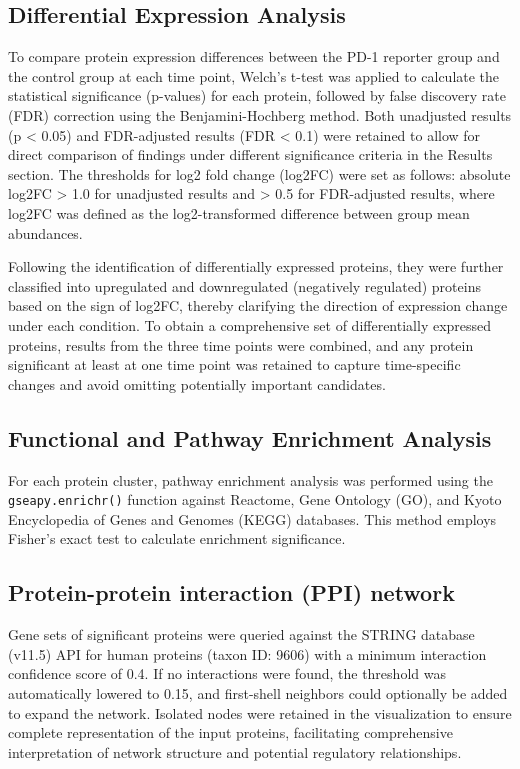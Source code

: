 \documentclass{article}
\begin{document}
    \subsection{Differential Expression Analysis}
    
      To compare protein expression differences between the PD-1 reporter group and the control group at each time point, Welch's t-test was applied to calculate the statistical significance (p-values) for each protein, followed by false discovery rate (FDR) correction using the Benjamini-Hochberg method. Both unadjusted results (p < 0.05) and FDR-adjusted results (FDR < 0.1) were retained to allow for direct comparison of findings under different significance criteria in the Results section. The thresholds for log2 fold change (log2FC) were set as follows: absolute log2FC > 1.0 for unadjusted results and > 0.5 for FDR-adjusted results, where log2FC was defined as the log2-transformed difference between group mean abundances.

      Following the identification of differentially expressed proteins, they were further classified into upregulated and downregulated (negatively regulated) proteins based on the sign of log2FC, thereby clarifying the direction of expression change under each condition. To obtain a comprehensive set of differentially expressed proteins, results from the three time points were combined, and any protein significant at least at one time point was retained to capture time-specific changes and avoid omitting potentially important candidates.

    \subsection{Functional and Pathway Enrichment Analysis}

      {\sloppy
        For each protein cluster, pathway enrichment analysis was performed using the \texttt{gseapy.enrichr()} function against Reactome, Gene Ontology (GO), and Kyoto Encyclopedia of Genes and Genomes (KEGG) databases. This method employs Fisher's exact test to calculate enrichment significance.
      \par}

    \subsection{Protein-protein interaction (PPI) network}

      Gene sets of significant proteins were queried against the STRING database (v11.5) API for human proteins (taxon ID: 9606) with a minimum interaction confidence score of 0.4. If no interactions were found, the threshold was automatically lowered to 0.15, and first-shell neighbors could optionally be added to expand the network. Isolated nodes were retained in the visualization to ensure complete representation of the input proteins, facilitating comprehensive interpretation of network structure and potential regulatory relationships.
\end{document}
